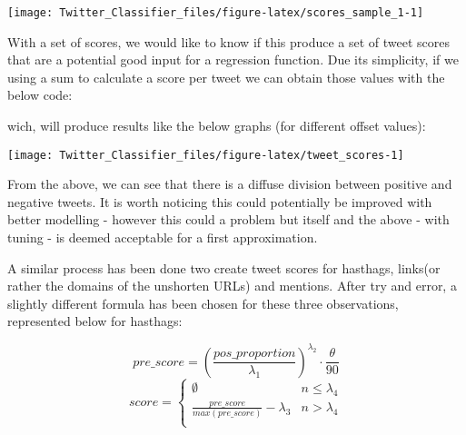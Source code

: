 \documentclass[11pt,]{article}
\newenvironment{Shaded}{\begin{snugshade}}{\end{snugshade}}
\newcommand{\DataTypeTok}[1]{\textcolor[rgb]{0.13,0.29,0.53}{#1}}
\newcommand{\KeywordTok}[1]{\textcolor[rgb]{0.13,0.29,0.53}{\textbf{#1}}}
\newcommand{\NormalTok}[1]{#1}
\newcommand{\OperatorTok}[1]{\textcolor[rgb]{0.81,0.36,0.00}{\textbf{#1}}}
\newcommand{\StringTok}[1]{\textcolor[rgb]{0.31,0.60,0.02}{#1}}
\begin{document}
\begin{center}\texttt{[image: Twitter\_Classifier\_files/figure-latex/scores\_sample\_1-1]} \end{center}

With a set of scores, we would like to know if this produce a set of
tweet scores that are a potential good input for a regression function.
Due its simplicity, if we using a sum to calculate a score per tweet we
can obtain those values with the below code:

\begin{Shaded}
\end{Shaded}

wich, will produce results like the below graphs (for different offset
values):

\begin{center}\texttt{[image: Twitter\_Classifier\_files/figure-latex/tweet\_scores-1]} \end{center}

From the above, we can see that there is a diffuse division between
positive and negative tweets. It is worth noticing this could
potentially be improved with better modelling - however this could a
problem but itself and the above - with tuning - is deemed acceptable
for a first approximation.

A similar process has been done two create tweet scores for hasthags,
links(or rather the domains of the unshorten URLs) and mentions. After
try and error, a slightly different formula has been chosen for these
three observations, represented below for hasthags:

\[pre\_score= \left( \frac{pos\_proportion}{\lambda_1} \right)^{\lambda_{2}} \cdot \frac{\theta}{90}\]
\[ score =
            \begin{cases}
            \emptyset & n \leq \lambda_4 \\
            \frac{pre\_score}{max(pre\_score)}  - \lambda_3 & n > \lambda_4 \\
            \end{cases}\]
\end{document}

